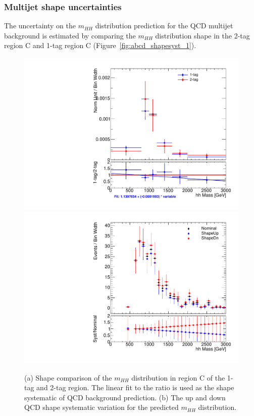 %
%
\subsubsection{Multijet shape uncertainties}
\label{sec:boosted_bkgd_qcdmultijet_shape_unc}
 
The uncertainty on the $m_{HH}$ distribution prediction for the QCD multijet background is estimated by comparing
the $m_{HH}$ distribution shape in the 2-tag region C and 1-tag region C (Figure~\ref{fig:abcd_shapesyst_1}).
 
\begin{figure}[!h]
\begin{center}
\includegraphics[scale=0.33]{./figures/boosted/ABCD/QCD_SR_hhMass.pdf}
\includegraphics[scale=0.33]{./figures/boosted/ABCD/Fit_QCD_SR_hhMass.pdf}
\caption{(a) Shape comparison of the $m_{HH}$ distribution in region C of the 1-tag and 2-tag region.
The linear fit to the ratio is used as the shape systematic of QCD background prediction.
(b) The up and down QCD shape systematic variation for the predicted $m_{HH}$ distribution.}
\label{fig:boosted_abcd_shapesyst}
\end{center}
\end{figure}

